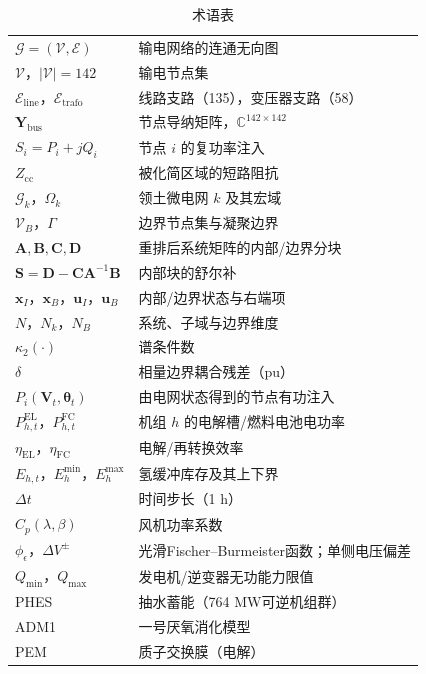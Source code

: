 \begin{table}[!t]
\caption{术语表}
\label{tab:nomenclature}
\centering
\footnotesize
\begin{tabular}{@{}p{} p{}@{}}
\toprule
$\mathcal{G} = (\mathcal{V}, \mathcal{E})$ & 输电网络的连通无向图 \\
$\mathcal{V}$，$|\mathcal{V}| = 142$ & 输电节点集 \\
$\mathcal{E}_{\mathrm{line}}$，$\mathcal{E}_{\mathrm{trafo}}$ & 线路支路（135），变压器支路（58） \\
$\mathbf{Y}_{\mathrm{bus}}$ & 节点导纳矩阵，$\mathbb{C}^{142 \times 142}$ \\
$S_i = P_i + j Q_i$ & 节点 $i$ 的复功率注入 \\
$Z_{\mathrm{cc}}$ & 被化简区域的短路阻抗 \\
$\mathcal{G}_k$，$\Omega_k$ & 领土微电网 $k$ 及其宏域 \\
$\mathcal{V}_B$，$\Gamma$ & 边界节点集与凝聚边界 \\
$\mathbf{A}, \mathbf{B}, \mathbf{C}, \mathbf{D}$ & 重排后系统矩阵的内部/边界分块 \\
$\mathbf{S} = \mathbf{D} - \mathbf{C}\mathbf{A}^{-1}\mathbf{B}$ & 内部块的舒尔补 \\
$\mathbf{x}_I$，$\mathbf{x}_B$，$\mathbf{u}_I$，$\mathbf{u}_B$ & 内部/边界状态与右端项 \\
$N$，$N_k$，$N_B$ & 系统、子域与边界维度 \\
$\kappa_2(\cdot)$ & 谱条件数 \\
$\delta$ & 相量边界耦合残差（pu） \\
$P_i(\mathbf{V}_t, \boldsymbol{\theta}_t)$ & 由电网状态得到的节点有功注入 \\
$P^{\mathrm{EL}}_{h,t}$，$P^{\mathrm{FC}}_{h,t}$ & 机组 $h$ 的电解槽/燃料电池电功率 \\
$\eta_{\mathrm{EL}}$，$\eta_{\mathrm{FC}}$ & 电解/再转换效率 \\
$E_{h,t}$，$E_h^{\min}$，$E_h^{\max}$ & 氢缓冲库存及其上下界 \\
$\Delta t$ & 时间步长（1 h） \\
$C_p(\lambda, \beta)$ & 风机功率系数 \\
$\phi_\epsilon$，$\Delta V^{\pm}$ & 光滑Fischer--Burmeister函数；单侧电压偏差 \\
$Q_{\min}$，$Q_{\max}$ & 发电机/逆变器无功能力限值 \\
PHES & 抽水蓄能（764 MW可逆机组群） \\
ADM1 & 一号厌氧消化模型 \\
PEM & 质子交换膜（电解） \\
\bottomrule
\end{tabular}
\end{table}

